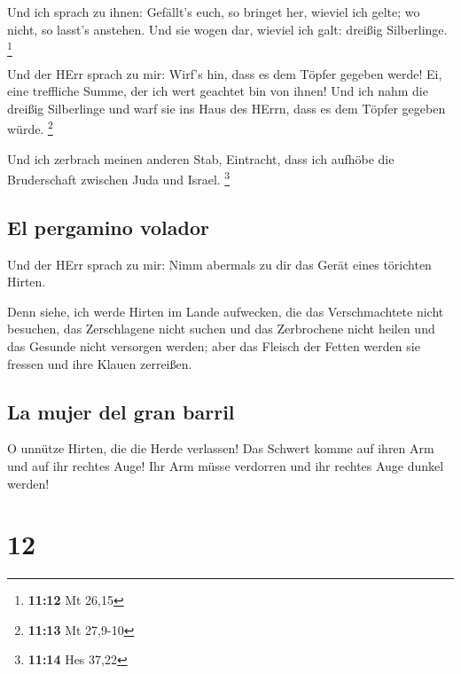  Und ich sprach zu ihnen: Gefällt's euch, so bringet her,
wieviel ich gelte; wo nicht, so lasst's anstehen. Und sie wogen dar,
wieviel ich galt: dreißig Silberlinge. \footnote{\textbf{11:12} Mt 26,15}

 Und der HErr sprach zu mir: Wirf's hin, dass es dem
Töpfer gegeben werde! Ei, eine treffliche Summe, der ich wert geachtet
bin von ihnen! Und ich nahm die dreißig Silberlinge und warf sie ins
Haus des HErrn, dass es dem Töpfer gegeben würde. \footnote{\textbf{11:13}
  Mt 27,9-10}

 Und ich zerbrach meinen anderen Stab, Eintracht, dass
ich aufhöbe die Bruderschaft zwischen Juda und Israel. \footnote{\textbf{11:14}
  Hes 37,22}

\hypertarget{el-pergamino-volador}{%
\subsection{El pergamino volador}\label{el-pergamino-volador}}

 Und der HErr sprach zu mir: Nimm abermals zu dir das
Gerät eines törichten Hirten.

 Denn siehe, ich werde Hirten im Lande aufwecken, die das
Verschmachtete nicht besuchen, das Zerschlagene nicht suchen und das
Zerbrochene nicht heilen und das Gesunde nicht versorgen werden; aber
das Fleisch der Fetten werden sie fressen und ihre Klauen zerreißen.

\hypertarget{la-mujer-del-gran-barril}{%
\subsection{La mujer del gran barril}\label{la-mujer-del-gran-barril}}

 O unnütze Hirten, die die Herde verlassen! Das Schwert
komme auf ihren Arm und auf ihr rechtes Auge! Ihr Arm müsse verdorren
und ihr rechtes Auge dunkel werden!

\hypertarget{section-11}{%
\section{12}\label{section-11}}

